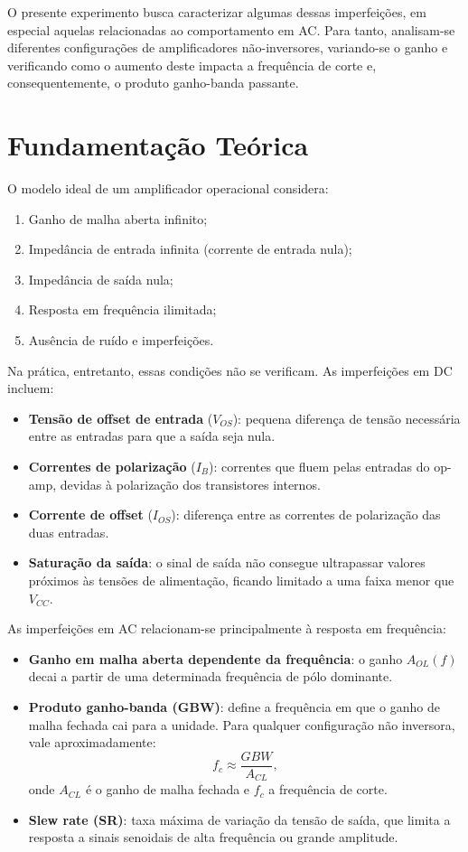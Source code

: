 \documentclass[10pt,twocolumn,letterpaper]{article}
\begin{document}
O presente experimento busca caracterizar algumas dessas imperfeições, em especial aquelas relacionadas ao comportamento em AC. Para tanto, analisam-se diferentes configurações de amplificadores não-inversores, variando-se o ganho e verificando como o aumento deste impacta a frequência de corte e, consequentemente, o produto ganho-banda passante.

\section{Fundamentação Teórica}

O modelo ideal de um amplificador operacional considera:
\begin{enumerate}
    \item Ganho de malha aberta infinito;
    \item Impedância de entrada infinita (corrente de entrada nula);
    \item Impedância de saída nula;
    \item Resposta em frequência ilimitada;
    \item Ausência de ruído e imperfeições.
\end{enumerate}

Na prática, entretanto, essas condições não se verificam. As imperfeições em DC incluem:

\begin{itemize}
    \item \textbf{Tensão de offset de entrada} ($V_{OS}$): pequena diferença de tensão necessária entre as entradas para que a saída seja nula.
    \item \textbf{Correntes de polarização} ($I_B$): correntes que fluem pelas entradas do op-amp, devidas à polarização dos transistores internos.
    \item \textbf{Corrente de offset} ($I_{OS}$): diferença entre as correntes de polarização das duas entradas.
    \item \textbf{Saturação da saída}: o sinal de saída não consegue ultrapassar valores próximos às tensões de alimentação, ficando limitado a uma faixa menor que $V_{CC}$.
\end{itemize}

As imperfeições em AC relacionam-se principalmente à resposta em frequência:

\begin{itemize}
    \item \textbf{Ganho em malha aberta dependente da frequência}: o ganho $A_{OL}(f)$ decai a partir de uma determinada frequência de pólo dominante.
    \item \textbf{Produto ganho-banda (GBW)}: define a frequência em que o ganho de malha fechada cai para a unidade. Para qualquer configuração não inversora, vale aproximadamente:
    \[
    f_c \approx \frac{GBW}{A_{CL}},
    \]
    onde $A_{CL}$ é o ganho de malha fechada e $f_c$ a frequência de corte.
    \item \textbf{Slew rate (SR)}: taxa máxima de variação da tensão de saída, que limita a resposta a sinais senoidais de alta frequência ou grande amplitude.
\end{itemize}
\end{document}

